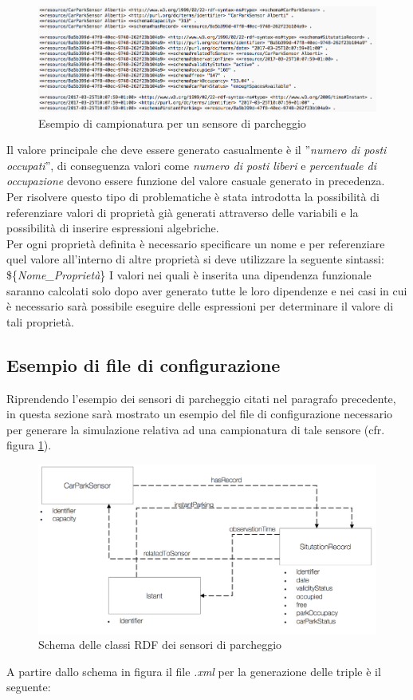 \documentclass[12pt,a4paper,italian]{article}
\begin{document}
\begin{figure}[h!]
	\centering
	\includegraphics[width=14cm]{img/carParkSensor.png}
	\caption{Esempio di campionatura per un sensore di parcheggio}\label{carparksensor}
\end{figure}

Il valore principale che deve essere generato casualmente è il  ''\emph{numero di posti occupati}'', di conseguenza valori come \emph{numero di posti liberi} e \emph{percentuale di occupazione} devono essere funzione del valore casuale generato in precedenza.\\
Per risolvere questo tipo di problematiche è stata introdotta la possibilità di referenziare valori di proprietà già generati attraverso delle variabili e la possibilità di 
inserire espressioni algebriche.\\
Per ogni proprietà definita è necessario specificare un nome e per referenziare quel valore all'interno di altre proprietà si deve utilizzare la seguente sintassi: \$\{\emph{Nome\_Proprietà}\}
I valori nei quali è inserita una dipendenza funzionale saranno calcolati solo dopo aver generato tutte le loro dipendenze e nei casi in cui è necessario sarà possibile eseguire delle espressioni per determinare il valore di tali proprietà.

\subsection{Esempio di file di configurazione}
Riprendendo l'esempio dei sensori di parcheggio citati nel paragrafo precedente, in questa sezione sarà mostrato un esempio del file di configurazione necessario per generare la simulazione relativa ad una campionatura di tale sensore (cfr. figura \ref{carparksensor}).

\begin{figure}[h!]
	\centering
	\includegraphics[width=14cm]{img/CPSschema.png}
	\caption{Schema delle classi RDF  dei sensori di parcheggio}\label{carparksensorschema}
\end{figure}
\newpage
A partire dallo schema in figura il file \emph{.xml} per la generazione delle triple è il seguente:\\
\end{document}
